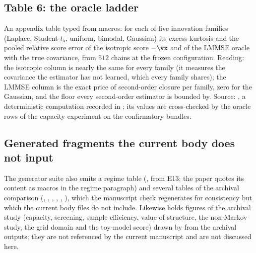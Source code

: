 \subsection{Table 6: the oracle ladder}

An appendix table typed from macros: for each of five innovation families (Laplace,
Student-$t_5$, uniform, bimodal, Gaussian) its excess kurtosis and the pooled relative
score error of the isotropic score $-\vx$ and of the LMMSE oracle with the true
covariance, from $512$ chains at the frozen configuration. Reading: the isotropic column
is nearly the same for every family (it measures the covariance the estimator has not
learned, which every family shares); the LMMSE column is the exact price of second-order
closure per family, zero for the Gaussian, and the floor every second-order estimator is
bounded by. Source: , a deterministic computation
recorded in ; its values are cross-checked by the
oracle rows of the capacity experiment on the confirmatory bundles.

\subsection{Generated fragments the current body does not input}

The generator suite also emits a regime table (, from E13; the
paper quotes its content as macros in the regime paragraph) and several tables of the
archival comparison (, , ,
, , ), which the manuscript
check regenerates for consistency but which the current body files do not include.
Likewise  holds figures of the archival study (capacity,
screening, sample efficiency, value of structure, the non-Markov study, the grid domain
and the toy-model score) drawn by  from the archival
outputs; they are not referenced by the current manuscript and are not discussed here.


